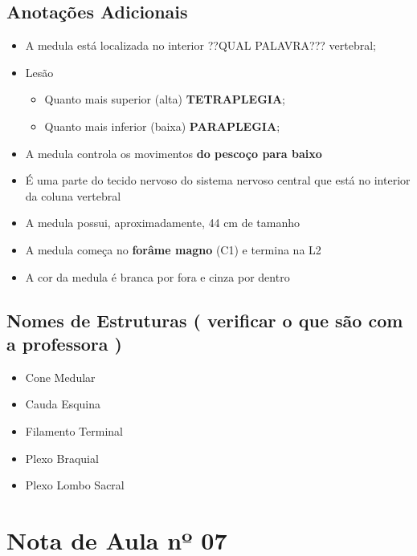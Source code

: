\documentclass[
]{book}
\providecommand{\tightlist}{%
  \setlength{\itemsep}{0pt}\setlength{\parskip}{0pt}}
\begin{document}
\hypertarget{anotauxe7uxf5es-adicionais}{%
\subsection{Anotações Adicionais}\label{anotauxe7uxf5es-adicionais}}

\begin{itemize}
\tightlist
\item
  A medula está localizada no interior ??QUAL PALAVRA??? vertebral;
\item
  Lesão

  \begin{itemize}
  \tightlist
  \item
    Quanto mais superior (alta) \textbf{TETRAPLEGIA};
  \item
    Quanto mais inferior (baixa) \textbf{PARAPLEGIA};
  \end{itemize}
\item
  A medula controla os movimentos \textbf{do pescoço para baixo}
\item
  É uma parte do tecido nervoso do sistema nervoso central que está no interior da coluna vertebral
\item
  A medula possui, aproximadamente, 44 cm de tamanho
\item
  A medula começa no \textbf{forâme magno} (C1) e termina na L2
\item
  A cor da medula é branca por fora e cinza por dentro
\end{itemize}

\hypertarget{nomes-de-estruturas-verificar-o-que-suxe3o-com-a-professora}{%
\subsection{Nomes de Estruturas ( verificar o que são com a professora )}\label{nomes-de-estruturas-verificar-o-que-suxe3o-com-a-professora}}

\begin{itemize}
\tightlist
\item
  Cone Medular
\item
  Cauda Esquina
\item
  Filamento Terminal
\item
  Plexo Braquial
\item
  Plexo Lombo Sacral
\end{itemize}

\hypertarget{nota-de-aula-nuxba-07}{%
\section{Nota de Aula nº 07}\label{nota-de-aula-nuxba-07}}
\end{document}
